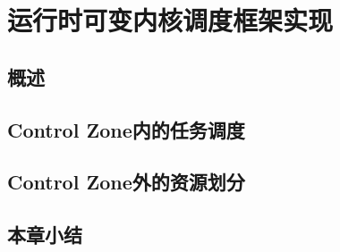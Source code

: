 \chapter{运行时可变内核调度框架实现}\label{chap:control_zone}

\section{概述}


\section{Control Zone内的任务调度}

\section{Control Zone外的资源划分}

\section{本章小结}